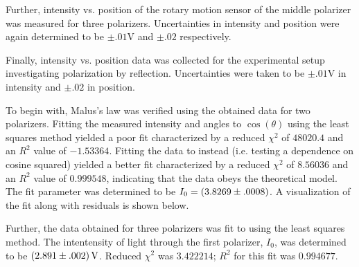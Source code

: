 \begin{paper}
	Further, intensity vs. position of the rotary motion sensor of the middle polarizer was measured for three polarizers. Uncertainties in intensity and position were again determined to be \( \pm .01 \si{\volt} \) and \( \pm .02\) respectively.
	
	Finally, intensity vs. position data was collected for the experimental setup investigating polarization by reflection. Uncertainties were taken to be \( \pm .01 \si{\volt} \) in intensity and \( \pm .02\) in position.
	
	
	To begin with, Malus's law was verified using the obtained data for two polarizers. Fitting the measured intensity and angles to \( \cos (\theta )\) using the least squares method yielded a poor fit characterized by a reduced \( \chi ^ 2 \) of \( 48020.4 \) and an \( R^2 \) value of \( -1.53364 \). Fitting the data to \eqMalusLaw instead (i.e. testing a dependence on cosine squared) yielded a better fit characterized by a reduced \( \chi ^ 2 \)	of \( 8.56036 \) and an \( R ^ 2 \) value of \( 0.999548 \), indicating that the data obeys the theoretical model. The fit parameter was determined to be \( I_0 = \left(3.8269 \pm .0008\right) \). A visualization of the fit along with residuals is shown below.
	
	Further, the data obtained for three polarizers was fit to \eqThreePolarizers using the least squares method. The intentensity of light through the first polarizer, \( I_0 \), was determined to be \( \left(2.891 \pm .002\right) \si{\volt} \). Reduced \( \chi^2 \) was \( 3.422214 \); \( R^2 \) for this fit was \( 0.994677 \).
	

\end{paper}

